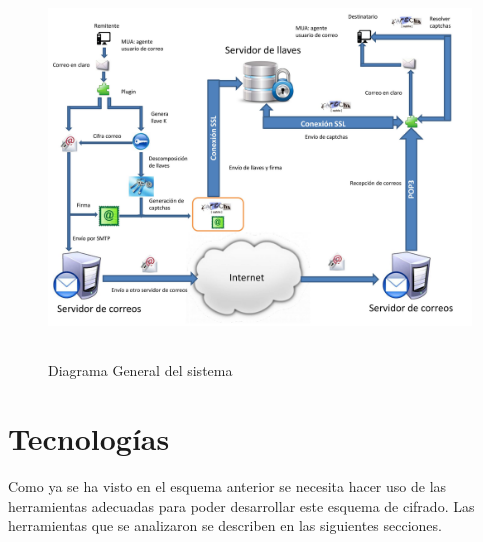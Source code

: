\begin{figure}[h]
	\includegraphics[width=1\linewidth, height=10cm]{./images/0001.jpg}
	\caption{Diagrama General del sistema}
	\label{fig:4-1-1}
\end{figure}
\section{Tecnologías}
Como ya se ha visto en el esquema anterior se necesita hacer uso de las herramientas adecuadas para poder desarrollar este esquema de cifrado. Las herramientas que se analizaron se describen en las siguientes secciones.\\
